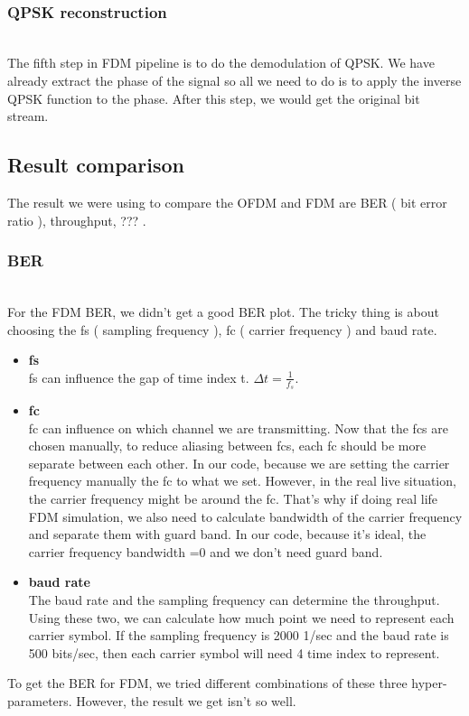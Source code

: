 \documentclass[twocolumn,conference]{IEEEtran}
\begin{document}
    \hfill\\\subsubsection{QPSK reconstruction}\hfill\\
    \indent The fifth step in FDM pipeline is to do the demodulation of QPSK. We have already extract the phase of the signal so all we need to do is to apply the inverse QPSK function to the phase. After this step, we would get the original bit stream.

\subsection{Result comparison}
The result we were using to compare the OFDM and FDM are BER ( bit error ratio ), throughput, ??? .

    \subsubsection{BER}\hfill\\
For the FDM BER, we didn’t get a good BER plot. The tricky thing is about choosing the fs ( sampling frequency ), fc ( carrier frequency ) and baud rate.
\begin{itemize}
    \item \textbf{fs}\\
 fs can influence the gap of time index t.  $\Delta t=\frac{1}{f_s}$.

    \item \textbf{fc}\\
fc can influence on which channel we are transmitting. Now that the fcs are chosen manually, to reduce aliasing between fcs, each fc should be more separate between each other. In our code, because we are setting the carrier frequency manually the fc to what we set. However, in the real live situation, the carrier frequency might be around the fc. That’s why if doing real life FDM simulation, we also need to calculate bandwidth of the carrier frequency and separate them with guard band. In our code, because it’s ideal, the carrier frequency bandwidth =0 and we don’t need guard band.

\item \textbf{baud rate}\\
The baud rate and the sampling frequency can determine the throughput. Using these two, we can calculate how much point we need to represent each carrier symbol. If the sampling frequency is 2000 1/sec and the baud rate is 500 bits/sec, then each carrier symbol will need 4 time index to represent.
\end{itemize}
To get the BER for FDM, we tried different combinations of these three hyper-parameters. However, the result we get isn't so well.
\end{document}
